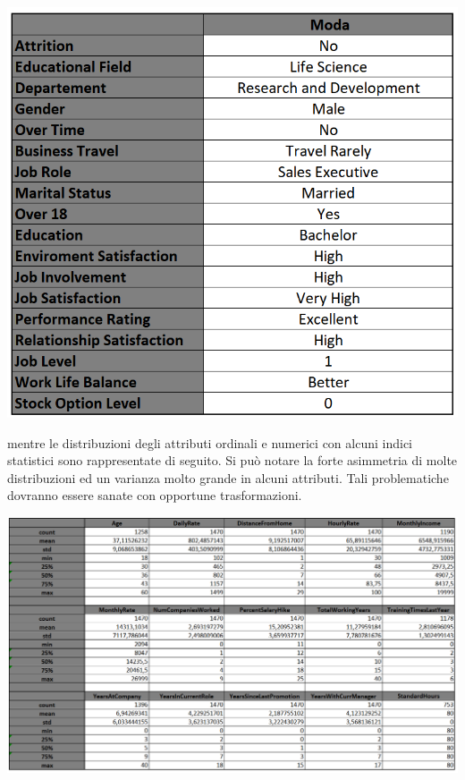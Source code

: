 \documentclass[english]{article}
\begin{document}
\begin{center}
\includegraphics[scale=1.28]{modacategoriciordinali.png}
\end{center}
 
 
mentre le distribuzioni degli attributi ordinali e numerici con alcuni indici statistici sono rappresentate di seguito.
Si può notare la forte asimmetria di molte distribuzioni ed un varianza molto grande in alcuni attributi. Tali problematiche dovranno essere sanate con opportune trasformazioni.

\begin{center}
\includegraphics[scale=1.3]{statistica.png}
\end{center}
\end{document}
